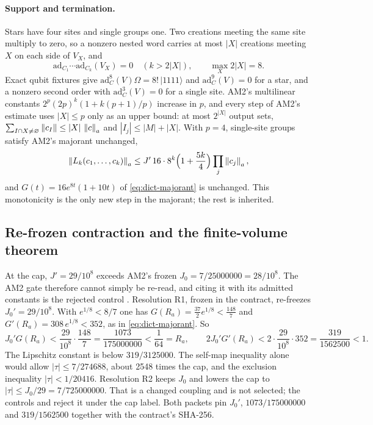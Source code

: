 \paragraph{Support and termination.}
Stars have four sites and single groups one. Two creations meeting the same
site multiply to zero, so a nonzero nested word carries at most $|X|$
creations meeting $X$ on each side of $V_X$, and
\begin{equation}
 \mathrm{ad}_{C_1}\cdots\mathrm{ad}_{C_k}(V_X)=0\quad(k>2|X|),\qquad
 \max_X2|X|=8 .
 \label{eq:ax1-termination}
\end{equation}
Exact qubit fixtures give $\mathrm{ad}_C^8(V)\Omega=8!\,|1111\rangle$ and
$\mathrm{ad}_C^9(V)=0$ for a star, and a nonzero second order with
$\mathrm{ad}_C^3(V)=0$ for a single site. AM2's multilinear constants
$2^p(2p)^k(1+k(p+1)/p)$ increase in $p$, and every step of AM2's estimate uses
$|X|\le p$ only as an upper bound: at most $2^{|X|}$ output sets,
$\sum_{I\cap X\ne\varnothing}\left\lVert c_I\right\rVert\le|X|\,\left\lVert c\right\rVert_a$ and
$|I_j|\le|M|+|X|$. With $p=4$, single-site groups satisfy AM2's majorant
unchanged,
\begin{equation}
 \left\lVert L_k(c_1,\ldots,c_k)\right\rVert_a\le J'\,16\cdot8^k\Bigl(1+\frac{5k}4\Bigr)
 \prod_j\left\lVert c_j\right\rVert_a ,
 \label{eq:ax1-majorant}
\end{equation}
and $G(t)=16e^{8t}(1+10t)$ of \eqref{eq:dict-majorant} is unchanged. This
monotonicity is the only new step in the majorant; the rest is inherited.

\subsection{Re-frozen contraction and the finite-volume theorem}
\label{sec:ax1-contraction}
At the cap, $J'=29/10^8$ exceeds AM2's frozen $J_0=7/25000000=28/10^8$. The
AM2 gate therefore cannot simply be re-read, and citing it with its admitted
constants is the rejected control . Resolution
R1, frozen in the contract, re-freezes $J_0'=29/10^8$. With $e^{1/8}<8/7$ one
has $G(R_a)=\tfrac{37}2e^{1/8}<\tfrac{148}7$ and
$G'(R_a)=308\,e^{1/8}<352$, as in \eqref{eq:dict-majorant}. So
\begin{equation}
 J_0'G(R_a)<\frac{29}{10^8}\cdot\frac{148}7=\frac{1073}{175000000}<\frac1{64}=R_a,
 \qquad
 2J_0'G'(R_a)<2\cdot\frac{29}{10^8}\cdot352=\frac{319}{1562500}<1 .
 \label{eq:ax1-contraction}
\end{equation}
The Lipschitz constant is below $319/3125000$. The self-map inequality alone
would allow $|\tau|\le7/274688$, about 2548 times the cap, and the exclusion
inequality $|\tau|<1/20416$. Resolution R2 keeps $J_0$ and lowers the cap to
$|\tau|\le J_0/29=7/725000000$. That is a changed coupling and is not
selected; the controls  and
 reject it under the cap label. Both packets
pin $J_0'$, $1073/175000000$ and $319/1562500$ together with the contract's
SHA-256.

